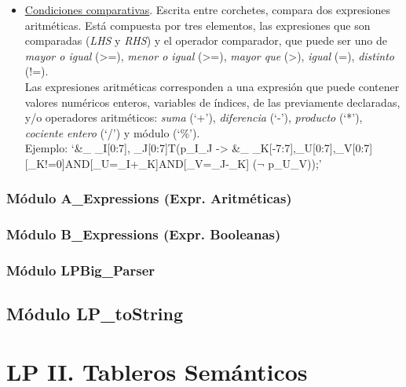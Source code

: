 \documentclass[a4paper]{report}
\begin{document}
\begin{itemize}
\begin{itemize}
\begin{itemize}
\item \underline{Condiciones comparativas}. Escrita entre corchetes, compara dos expresiones aritméticas. Está compuesta por tres elementos, las expresiones que son comparadas (\textit{LHS} y \textit{RHS}) y el operador comparador, que puede ser uno de \textit{mayor o igual} (>=), \textit{menor o igual} (>=), \textit{mayor que} (>), \textit{igual} (=), \textit{distinto} (!=).\\
\newpage
Las expresiones aritméticas corresponden a una expresión que puede contener valores numéricos enteros, variables de índices, de las previamente declaradas, y/o operadores aritméticos: \textit{suma} (`+'), \textit{diferencia} (`-'), \textit{producto} (`*'), \textit{cociente entero} (`/') y módulo (`\%'). \\

Ejemplo: 
\textrm{\small`\&\_ {\_I[0:7], \_J[0:7]}{T}(p\_I\_J -> \&\_ {\_K[-7:7],\_U[0:7],\_V[0:7]} {[\_K!=0]AND[\_U=\_I+\_K]AND[\_V=\_J-\_K]} ($\neg$ p\_U\_V));'} 

\end{itemize}
\end{itemize}



\end{itemize}





\subsection{Módulo A\_Expressions (Expr. Aritméticas)}
\subsection{Módulo B\_Expressions (Expr. Booleanas)}
\subsection{Módulo LPBig\_Parser}

\section{Módulo LP\_toString}



\chapter{LP II. Tableros Semánticos}
\renewcommand{\mtctitle}{}
\mtcskip
\minitoc
\newpage
\end{document}
